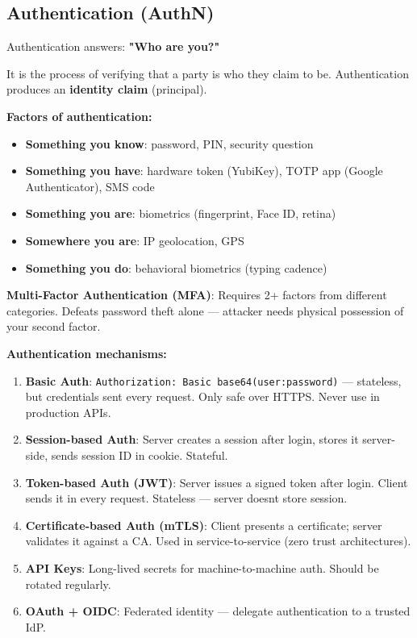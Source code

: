 \documentclass[11pt]{article}
\providecommand{\tightlist}{\setlength{\itemsep}{1pt}\setlength{\parskip}{0pt}}
\begin{document}
\subsection{Authentication (AuthN)}\label{authentication-authn}

Authentication answers: \textbf{"Who are you?"}

It is the process of verifying that a party is who they claim to be. Authentication produces an \textbf{identity claim} (principal).

\textbf{Factors of authentication:}

\begin{itemize}
\tightlist
\item
  \textbf{Something you know}: password, PIN, security question
\item
  \textbf{Something you have}: hardware token (YubiKey), TOTP app (Google Authenticator), SMS code
\item
  \textbf{Something you are}: biometrics (fingerprint, Face ID, retina)
\item
  \textbf{Somewhere you are}: IP geolocation, GPS
\item
  \textbf{Something you do}: behavioral biometrics (typing cadence)
\end{itemize}

\textbf{Multi-Factor Authentication (MFA)}: Requires 2+ factors from different categories. Defeats password theft alone --- attacker needs physical possession of your second factor.

\textbf{Authentication mechanisms:}

\begin{enumerate}
\def\labelenumi{\arabic{enumi}.}
\tightlist
\item
  \textbf{Basic Auth}: \texttt{Authorization:\ Basic\ base64(user:password)} --- stateless, but credentials sent every request. Only safe over HTTPS. Never use in production APIs.
\item
  \textbf{Session-based Auth}: Server creates a session after login, stores it server-side, sends session ID in cookie. Stateful.
\item
  \textbf{Token-based Auth (JWT)}: Server issues a signed token after login. Client sends it in every request. Stateless --- server doesn\textquotesingle t store session.
\item
  \textbf{Certificate-based Auth (mTLS)}: Client presents a certificate; server validates it against a CA. Used in service-to-service (zero trust architectures).
\item
  \textbf{API Keys}: Long-lived secrets for machine-to-machine auth. Should be rotated regularly.
\item
  \textbf{OAuth + OIDC}: Federated identity --- delegate authentication to a trusted IdP.
\end{enumerate}
\end{document}
